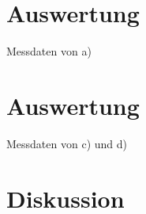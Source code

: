 
\section{Auswertung}\justifying

  \begin{table}[H]
        \centering
        \caption{Messdaten von a)}
         
        \label{tab:data_a}
  \end{table}

\section{Auswertung}\justifying

  \begin{table}[H]
        \centering
        \caption{Messdaten von c) und d)}
         
        \label{tab:data_c}
  \end{table}


\section{Diskussion}\justifying

\newpage
\nocite{V354}
\printbibliography





